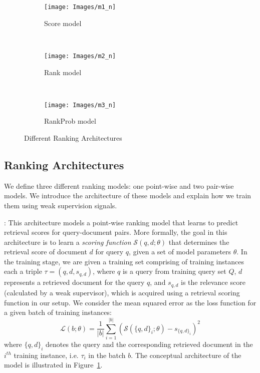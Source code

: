 \documentclass[sigconf]{acmart}
\newcommand{\Modelone}{Score model\xspace}
\newcommand{\mone}{Score\xspace}
\newcommand{\mtwo}{Rank\xspace}
\newcommand{\mthree}{RankProb\xspace}
\newcommand{\sshrink}{\vspace{-.80ex}}
\begin{document}
\label{sec:models}
\begin{figure}[t]
    \centering
    \begin{subfigure}[t]{0.23\columnwidth}
        \centering
        \texttt{[image: Images/m1\_n]}\vspace*{-3ex}\caption{\label{fig:m1}\mone model}
    \end{subfigure}~
    \begin{subfigure}[t]{0.40\columnwidth}
        \centering
        \texttt{[image: Images/m2\_n]}\vspace*{-3ex}\caption{\label{fig:m2}\mtwo model}
    \end{subfigure}~
    \begin{subfigure}[t]{0.37\columnwidth}
        \centering
        \texttt{[image: Images/m3\_n]}\vspace*{-3ex}\caption{\label{fig:m3}\mthree model}
    \end{subfigure}\vspace*{-2ex}\caption{\label{fig:ranking-arch} Different Ranking Architectures}
    \vspace{-20pt}
\end{figure}
\sshrink
\subsection{Ranking Architectures}
We define three different ranking models: 
one point-wise and two pair-wise models. 
We introduce the architecture of these models and explain how we train them using weak supervision signals.

\mypar{\Modelone}: This architecture models a point-wise ranking model that learns to predict retrieval scores for query-document pairs. More formally, the goal in this architecture is to learn a \emph{scoring function} $\mathcal{S}(q, d; \theta)$ that determines the retrieval score of document $d$ for query $q$, given a set of model parameters $\theta$.
In the training stage, we are given a training set comprising of training instances each a triple $\tau = (q,d, s_{q,d})$, where $q$ is a query from training query set $Q$, $d$ represents a retrieved document for the query $q$, and $s_{q,d}$ is the relevance score (calculated by a weak supervisor), which is acquired using a retrieval scoring function in our setup.
We consider the mean squared error as the loss function for a given batch of training instances:
\begin{equation}
\mathcal{L}(b; \theta) = \frac{1}{|b|} \sum_{i=1}^{|b|}{(\mathcal{S}(\{q, d\}_i; \theta) - s_{\{q, d\}_i})^2}
\end{equation}
where $\{q, d\}_i$ denotes the query and the corresponding retrieved document in the $i^{th}$ training instance, i.e. $\tau_i$ in the batch $b$.
The conceptual architecture of the model is illustrated in Figure~\ref{fig:m1}.
\end{document}
